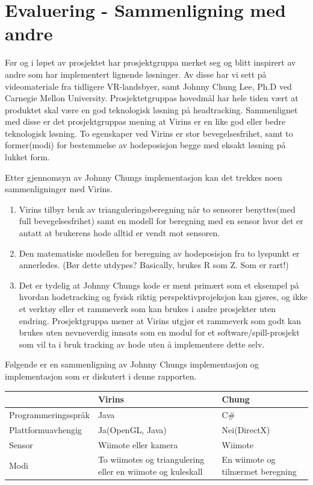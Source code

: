 \documentclass{report}
\begin{document}
\section{Evaluering - Sammenligning med andre}
Før og i  løpet av prosjektet har prosjektgruppa merket seg og blitt inspirert av andre som har implementert lignende
løsninger. Av disse har vi sett på videomateriale fra tidligere VR-landsbyer, samt Johnny Chung Lee, Ph.D ved Carnegie Mellon University.
Prosjektetgruppas hovedmål har hele tiden vært at produktet skal være en god teknologisk løsning på headtracking.
Sammenlignet med disse er det prosjektgruppas mening at Virins er en like god eller bedre teknologisk løsning.
To egenskaper ved Virins er stor bevegelsesfrihet, samt to former(modi) for bestemmelse av hodeposisjon begge med eksakt løsning på lukket form.


Etter gjennomsyn av Johnny Chungs implementasjon kan det trekkes noen sammenligninger med Virins.
\begin{enumerate}
\item Virins tilbyr bruk av trianguleringsberegning når to sensorer benyttes(med full bevegelsesfrihet) samt en modell for beregning med en sensor hvor det er antatt at brukerens hode alltid er vendt mot sensoren.
\item Den matematiske modellen for beregning av hodeposisjon fra to lyspunkt er annerledes. (Bør dette utdypes? Basically, brukes R som Z. Som er rart!)
\item Det er tydelig at Johnny Chungs kode er ment primært som et eksempel på hvordan hodetracking og fysisk riktig perspektivprojeksjon
kan gjøres, og ikke et verktøy eller et rammeverk som kan brukes i andre prosjekter uten endring. Prosjektgruppa mener at Virins utgjør et rammeverk som godt kan brukes uten nevneverdig innsats som en modul for et software/spill-prosjekt som vil ta i bruk tracking av hode uten å implementere dette selv.
\end{enumerate}
Følgende er en sammenligning av Johnny Chungs implementasjon og implementasjon som er diskutert i denne rapporten.

\begin{tabular}{| l | p{4cm} | p{4cm} | }
\hline			
                        & \textbf{Virins}                                               & \textbf{Chung} \\
\hline
  Programmeringsspråk   & Java                                                          & C\# \\
\hline
  Plattformuavhengig    & Ja(OpenGL, Java)                                              & Nei(DirectX) \\
\hline
  Sensor                & Wiimote eller kamera                                          & Wiimote \\
\hline
  Modi                  & To wiimotes og triangulering eller en wiimote og kuleskall    & En wiimote og tilnærmet beregning \\
\hline  
\end{tabular}
\end{document}
